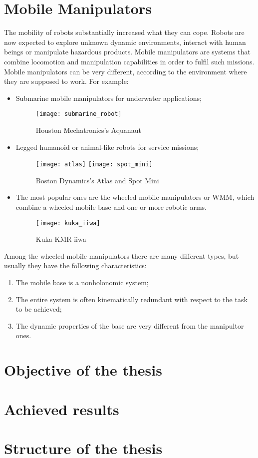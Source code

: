 \section{Mobile Manipulators}
The mobility of robots substantially increased what they can cope. Robots are now expected to explore unknown dynamic environments, interact with human beings or manipulate hazardous products. Mobile manipulators are systems that combine locomotion and manipulation capabilities in order to fulfil such missions. \\
Mobile manipulators can be very different, according to the environment where they are supposed to work. For example:
\begin{itemize}
	\item Submarine mobile manipulators for underwater applications;
	\begin{figure}[h!]
		\centering
		\texttt{[image: submarine\_robot]}
		\caption{Houston Mechatronics's Aquanaut}
		\label{fig:aquanaut} 
	\end{figure}
	\item Legged humanoid or animal-like robots for service missions;
	\begin{figure}[h]
		\centering 
		\texttt{[image: atlas]}
		\label{fig:atlas} 
		\quad
		\texttt{[image: spot\_mini]}
		\label{fig:spotmini} 
		\caption{Boston Dynamics's Atlas and Spot Mini}
	\end{figure}
	\item The most popular ones are the wheeled mobile manipulators or WMM, which combine a wheeled mobile base and one or more robotic arms.
	\begin{figure}[h!]
		\centering
		\texttt{[image: kuka\_iiwa]}
		\caption{Kuka KMR iiwa}
		\label{fig:iiwa} 
	\end{figure}
\end{itemize}
Among the wheeled mobile manipulators there are many different types, but usually they have the following characteristics:
\begin{enumerate}
	\item The mobile base is a nonholonomic system;
	\item The entire system is often kinematically redundant with respect to the task to be achieved;
	\item The dynamic properties of the base are very different from the manipultor ones.
\end{enumerate}


\section{Objective of the thesis}

\section{Achieved results}
\section{Structure of the thesis}


